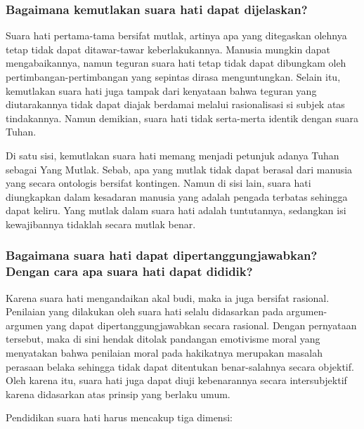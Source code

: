 \documentclass[11pt,twoside,a5paper,openany]{memoir}
\begin{document}
\hypertarget{bagaimana-kemutlakan-suara-hati-dapat-dijelaskan}{%
\subsubsection{Bagaimana kemutlakan suara hati dapat
dijelaskan?}\label{bagaimana-kemutlakan-suara-hati-dapat-dijelaskan}}

Suara hati pertama-tama bersifat mutlak, artinya apa yang ditegaskan
olehnya tetap tidak dapat ditawar-tawar keberlakukannya. Manusia mungkin
dapat mengabaikannya, namun teguran suara hati tetap tidak dapat
dibungkam oleh pertimbangan-pertimbangan yang sepintas dirasa
menguntungkan. Selain itu, kemutlakan suara hati juga tampak dari
kenyataan bahwa teguran yang diutarakannya tidak dapat diajak berdamai
melalui rasionalisasi si subjek atas tindakannya. Namun demikian, suara
hati tidak serta-merta identik dengan suara Tuhan.

Di satu sisi, kemutlakan suara hati memang menjadi petunjuk adanya Tuhan
sebagai Yang Mutlak. Sebab, apa yang mutlak tidak dapat berasal dari
manusia yang secara ontologis bersifat kontingen. Namun di sisi lain,
suara hati diungkapkan dalam kesadaran manusia yang adalah pengada
terbatas sehingga dapat keliru. Yang mutlak dalam suara hati adalah
tuntutannya, sedangkan isi kewajibannya tidaklah secara mutlak benar.

\hypertarget{bagaimana-suara-hati-dapat-dipertanggungjawabkan-dengan-cara-apa-suara-hati-dapat-dididik}{%
\subsubsection{Bagaimana suara hati dapat dipertanggungjawabkan? Dengan
cara apa suara hati dapat
dididik?}\label{bagaimana-suara-hati-dapat-dipertanggungjawabkan-dengan-cara-apa-suara-hati-dapat-dididik}}

Karena suara hati mengandaikan akal budi, maka ia juga bersifat
rasional. Penilaian yang dilakukan oleh suara hati selalu didasarkan
pada argumen-argumen yang dapat dipertanggungjawabkan secara rasional.
Dengan pernyataan tersebut, maka di sini hendak ditolak pandangan
emotivisme moral yang menyatakan bahwa penilaian moral pada hakikatnya
merupakan masalah perasaan belaka sehingga tidak dapat ditentukan
benar-salahnya secara objektif. Oleh karena itu, suara hati juga dapat
diuji kebenarannya secara intersubjektif karena didasarkan atas prinsip
yang berlaku umum.

Pendidikan suara hati harus mencakup tiga dimensi:
\end{document}
